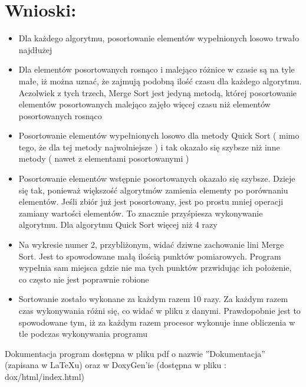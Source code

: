 \documentclass[10 pt]{article}
\begin{document}
\section{Wnioski:}
\begin{itemize}
\item Dla każdego algorytmu, posortowanie elementów wypełnionych losowo trwało najdłużej
\item Dla elementów posortowanych rosnąco i malejąco różnice w czasie są na tyle małe, iż można uznać, że
zajmują podobną ilość czasu dla każdego algorytmu. Aczolwiek z tych trzech, Merge Sort jest jedyną metodą,
której posortowanie elementów posortowanych malejąco zajęło więcej czasu niż elementów posortowanych
rosnąco
\item Posortowanie elementów wypełnionych losowo dla metody Quick Sort ( mimo tego, że dla tej metody
najwolniejsze ) i tak okazało się szybsze niż inne metody ( nawet z elementami posortowanymi )
\item Posortowanie elementów wstępnie posortowanych okazało się szybsze. Dzieje się tak, ponieważ większość
algorytmów zamienia elementy po porównaniu elementów. Jeśli zbiór już jest posortowany, jest po prostu
mniej operacji zamiany wartości elementów. To znacznie przyśpiesza wykonywanie algorytmu. Dla
algorytmu Quick Sort więcej niż 4 razy
\item Na wykresie numer 2, przybliżonym, widać dziwne zachowanie lini Merge Sort. Jest to spowodowane małą
ilością punktów pomiarowych. Program wypełnia sam miejsca gdzie nie ma tych punktów przwidując ich
położenie, co często nie jest poprawnie robione
\item Sortowanie zostało wykonane za każdym razem 10 razy. Za każdym razem czas wykonywania różni się, co
widać w pliku z danymi. Prawdopobnie jest to spowodowane tym, iż za każdym razem procesor wykonuje
inne obliczenia w tle podczas wykonywania programu

\end{itemize}
Dokumentacja program dostępna w pliku pdf o nazwie ''Dokumentacja'' (zapisana w \LaTeX u) oraz w DoxyGen'ie (dostępna w pliku : dox/html/index.html)
\end{document}
